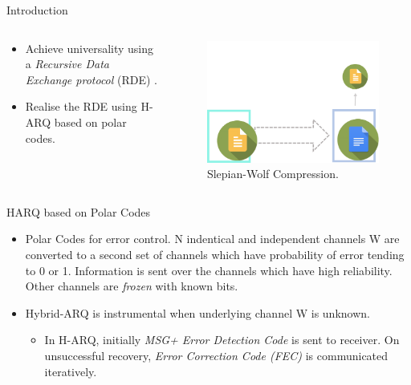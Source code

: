 \documentclass[final,hyperref={pdfpagelabels=false}]{beamer}
\begin{document}
\begin{frame}[t]
\begin{columns}[t]
\begin{column}{.465\textwidth}
\begin{block}{Introduction}
\begin{columns}
\begin{column}{.5\textwidth}
\begin{itemize}
\begin{itemize}
\item Achieve universality using a \emph{Recursive Data Exchange protocol} (RDE)   
 \cite{HTRDE}.
\item Realise the RDE using H-ARQ based on polar codes. 
\end{itemize}
\end{itemize}
\end{column}
\begin{column}{.5\textwidth} %
\centering
\begin{figure}
\includegraphics[width=0.8\linewidth]{slepian.png}
\caption{Slepian-Wolf Compression.}
\end{figure}
\end{column}
\end{columns} %


\end{block}

\begin{block}{HARQ based on Polar Codes}
\begin{itemize}
\item Polar Codes for error control.
N indentical and independent channels W are converted to a second set of channels which have probability of error tending to 0 or 1. Information is sent over the channels which have high reliability. Other channels are \emph{frozen} with known bits.
\item Hybrid-ARQ is instrumental when underlying channel W is unknown.
\begin{itemize}
\item In H-ARQ, initially \emph{MSG+ Error Detection Code} is sent to receiver. On unsuccessful recovery, \emph{Error Correction Code (FEC)} is communicated iteratively.
\end{itemize}
\end{itemize}


\end{block}
\end{column}
\end{columns}
\end{frame}
\end{document}
